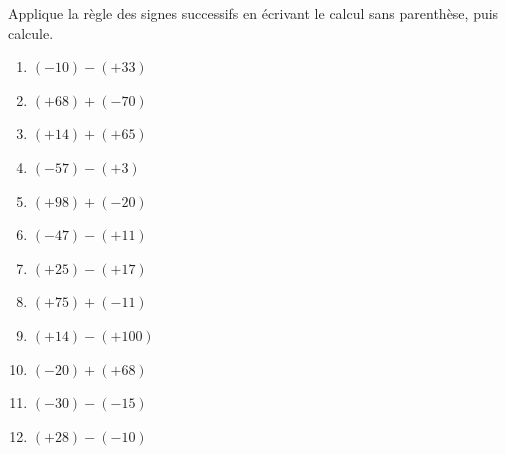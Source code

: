 %
%
	Applique la règle des signes successifs en écrivant le calcul sans parenthèse, puis calcule.
	\begin{enumerate}[cols=3]
		\item $(-10)-(+33)$
		\item $(+68)+(-70)$
		\item $(+14)+(+65)$
		\item $(-57)-(+3)$
		\item $(+98)+(-20)$
		\item $(-47)-(+11)$
		\item $(+25)-(+17)$
		\item $(+75)+(-11)$
		\item $(+14)-(+100)$
		\item $(-20)+(+68)$
		\item $(-30) - (-15)$
		\item $(+28)-(-10)$
	\end{enumerate}
